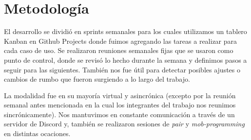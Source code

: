 \section{Metodología}

El desarrollo se dividió en sprints semanales para los cuales utilizamos un tablero Kanban en Github Projects donde fuimos agregando las tareas a realizar para cada caso de uso. Se realizaron reuniones semanales fijas que se usaron como punto de control, donde se revisó lo hecho durante la semana y definimos pasos a seguir para las siguientes. También nos fue útil para detectar posibles ajustes o cambios de rumbo que fueron surgiendo a lo largo del trabajo.

La modalidad fue en su mayoría virtual y asincrónica (excepto por la reunión semanal antes
mencionada en la cual los integrantes del trabajo nos reunimos sincrónicamente). Nos mantuvimos en constante comunicación a través de un servidor de Discord y, también se realizaron sesiones de \textit{pair} y \textit{mob-programming} en distintas ocaciones.